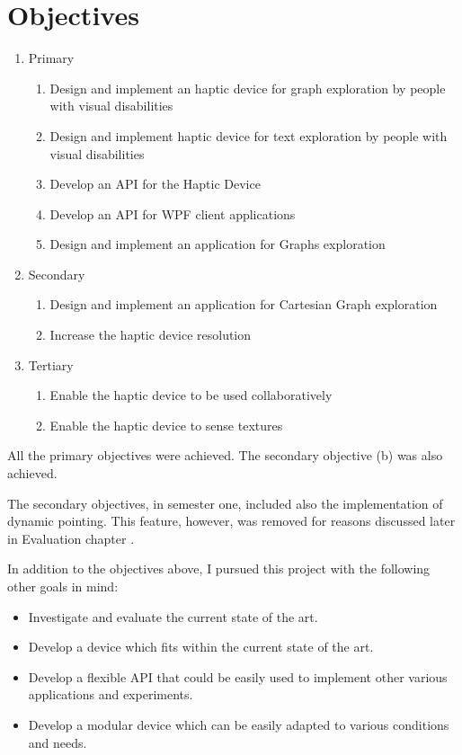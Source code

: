\chapter{Objectives}


\begin{enumerate}
	\item Primary
    \begin{enumerate}
    	\item Design and implement an haptic device for graph exploration by people with visual disabilities
        \item Design and implement haptic device for text exploration by people with visual disabilities
        \item Develop an API for the Haptic Device
        \item Develop an API for WPF client applications
        \item Design and implement an application for Graphs exploration
    \end{enumerate}
    \item Secondary
    \begin{enumerate}
    	\item Design and implement an application for Cartesian Graph exploration
        \item Increase the haptic device resolution
    \end{enumerate}
    \item Tertiary
    \begin{enumerate}
    	\item Enable the haptic device to be used collaboratively
        \item Enable the haptic device to sense textures
    \end{enumerate}
\end{enumerate}

All the primary objectives were achieved. The secondary objective (b) was also achieved. 

The secondary objectives, in semester one, included also the implementation of dynamic pointing. This feature, however, was removed for reasons discussed later in Evaluation chapter .

In addition to the objectives above, I pursued this project with the following other goals in mind:
\begin{itemize}
	\item Investigate and evaluate the current state of the art.
    \item Develop a device which fits within the current state of the art.
    \item Develop a flexible API that could be easily used to implement other various applications and experiments.
    \item Develop a modular device which can be easily adapted to various conditions and needs.
\end{itemize}